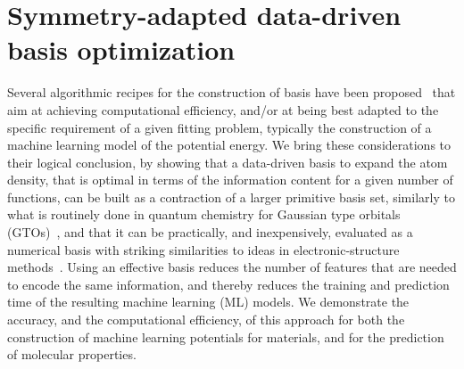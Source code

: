 \chapter{Symmetry-adapted data-driven basis optimization}
\label{sec:basisopt}

Several algorithmic recipes for the construction of basis have been proposed~\cite{shapeev2016moment, drau19prb, dusson2022atomic, musil2021efficient} that aim at achieving computational efficiency, and/or at being best adapted to the specific requirement of a given fitting problem, typically the construction of a machine learning model of the potential energy.
We bring these considerations to their logical conclusion, by showing that a data-driven basis to expand the atom density, that is optimal in terms of the information content for a given number of functions, can be built as a contraction of a larger primitive basis set, similarly to what is routinely done in quantum chemistry for Gaussian type orbitals (GTOs)~\cite{scha+92jcp}, and that it can be practically, and inexpensively, evaluated as a numerical basis with striking similarities to ideas in electronic-structure methods~\cite{AIMS}.
Using an effective basis reduces the number of features that are needed to encode the same information, and thereby reduces the training and prediction time of the resulting machine learning (ML) models.
We demonstrate the accuracy, and the computational efficiency, of this approach for both the construction of machine learning potentials for materials, and for the prediction of molecular properties. 

